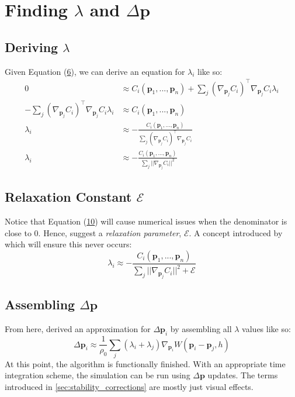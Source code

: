\documentclass[sigplan,screen]{acmart}
\begin{document}
\section{Finding $\lambda$ and $\Delta \textbf{p}$}
\subsection{Deriving $\lambda$}
Given Equation (\hyperref[constraint_approx]{6}), we can derive an equation for $\lambda_i$ like so:
\begin{align}
  0 &\approx C_i(\mathbf{p}_1, ...,\mathbf{p}_n) + \sum_j (\nabla_{\mathbf{p}_j} C_i)^\top \nabla_{\mathbf{p}_j} C_i \lambda_i\\
  - \sum_j (\nabla_{\mathbf{p}_j} C_i)^\top \nabla_{\mathbf{p}_j} C_i \lambda_i &\approx C_i(\mathbf{p}_1, ...,\mathbf{p}_n)\\
  \lambda_i &\approx - \frac{C_i(\mathbf{p}_1, ...,\mathbf{p}_n)}{\sum_j (\nabla_{\mathbf{p}_j} C_i)^\top \nabla_{\mathbf{p}_j} C_i}\\
  \lambda_i &\approx - \frac{C_i(\mathbf{p}_1, ...,\mathbf{p}_n)}{\sum_j ||\nabla_{\mathbf{p}_j} C_i||^2}
\end{align}
\subsection{Relaxation Constant $\mathcal{E}$}
Notice that Equation (\hyperref[constraint_approx]{10}) will cause numerical issues when the denominator is close to 0. Hence, \cite{Muller} suggest a \textit{relaxation parameter}, $\mathcal{E}$. A concept introduced by \cite{Solenthaler} which will ensure this never occurs:
\begin{equation}
  \lambda_i \approx - \frac{C_i(\mathbf{p}_1, ...,\mathbf{p}_n)}{\sum_j ||\nabla_{\mathbf{p}_j} C_i||^2 + \mathcal{E}}
\end{equation}
\subsection{Assembling $\Delta \mathbf{p}$}
From here, \cite{Muller} derived an approximation for $\Delta \mathbf{p}_i$ by assembling all $\lambda$ values like so:
\begin{equation}
  \Delta \mathbf{p}_i \approx \frac{1}{\rho_0} \sum_j (\lambda_i + \lambda_j) \nabla_{\mathbf{p}_i}W(\mathbf{p}_i - \mathbf{p}_j, h)
\end{equation}
At this point, the algorithm is functionally finished. With an appropriate time integration scheme, the simulation can be run using $\Delta \mathbf{p}$ updates. The terms introduced in \ref{sec:stability_corrections} are mostly just visual effects.
\end{document}
